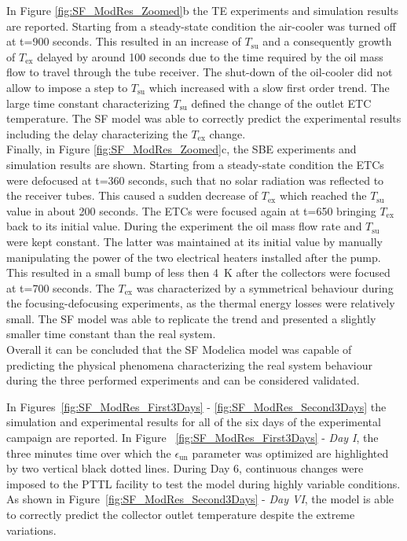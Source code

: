 \documentclass[final,3p,times,review]{elsarticle}
\begin{document}
In Figure \ref{fig:SF_ModRes_Zoomed}b the TE experiments and simulation results are reported. Starting from a steady-state condition the air-cooler was turned off at t=900 seconds. This resulted in an increase of $T_\mathrm{su}$ and a consequently growth of $T_\mathrm{ex}$ delayed by around 100 seconds due to the time required by the oil mass flow to travel through the tube receiver. The shut-down of the oil-cooler did not allow to impose a step to $T_\mathrm{su}$ which increased with a slow first order trend. The large time constant characterizing $T_\mathrm{su}$ defined the change of the outlet ETC temperature. The SF model was able to correctly predict the experimental results including  the delay characterizing the $T_\mathrm{ex}$ change.\\

Finally, in Figure \ref{fig:SF_ModRes_Zoomed}c, the SBE experiments and simulation results are shown. Starting from a steady-state condition the ETCs were defocused at t=360 seconds, such that no solar radiation was reflected to the receiver tubes. This caused a sudden decrease of $T_\mathrm{ex}$ which reached the $T_\mathrm{su}$ value in about 200 seconds. The ETCs were focused again at t=650 bringing $T_\mathrm{ex}$ back to its initial value. During the experiment the oil mass flow rate and $T_\mathrm{su}$ were kept constant. The latter was maintained at its initial value by manually manipulating the power of the two electrical heaters installed after the pump. This resulted in a small bump of less then 4~K after the collectors were focused at t=700 seconds. The $T_\mathrm{ex}$ was characterized by a symmetrical behaviour during the focusing-defocusing experiments, as the thermal energy losses were relatively small. The SF model was able to replicate the trend and presented a slightly smaller time constant than the real system.\\
Overall it can be concluded that the SF Modelica model was capable of predicting the physical phenomena characterizing the real system behaviour during the three performed experiments and can be considered validated.

In Figures~\ref{fig:SF_ModRes_First3Days} - \ref{fig:SF_ModRes_Second3Days}  the simulation and experimental results for all of the six days of the experimental campaign are reported. In Figure ~\ref{fig:SF_ModRes_First3Days} - \textit{Day I}, the three minutes time over which the $\epsilon_\mathrm{un}$ parameter was optimized are highlighted by two vertical black dotted lines. During Day 6, continuous changes were imposed to the PTTL facility to test the model during highly variable conditions. As shown in Figure~\ref{fig:SF_ModRes_Second3Days} - \textit{Day VI}, the model is able to correctly predict the collector outlet temperature despite the  extreme variations.
\end{document}
